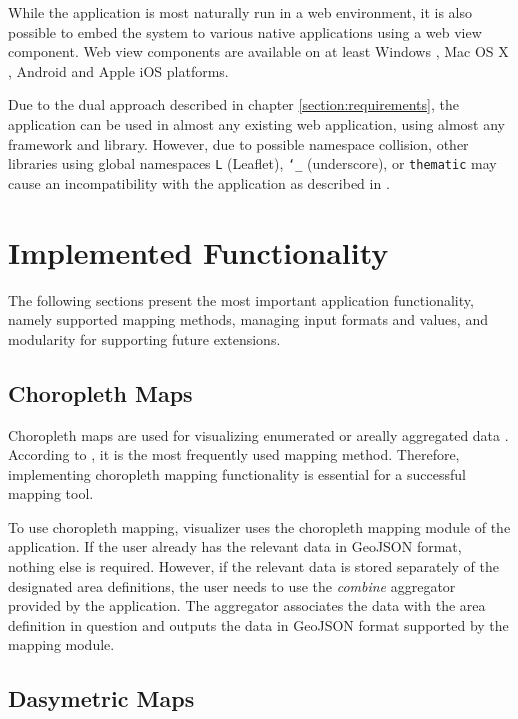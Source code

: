 While the application is most naturally run in a web environment, it is also possible to embed the system to various native applications using a web view component. Web view components are available on at least Windows \citep{small_ten_2012}, Mac OS X \citep{hunter_why_2014}, Android \citep{google_building_2014} and Apple iOS \citep{apple_uiwebview_2014} platforms.

Due to the dual approach described in chapter \ref{section:requirements}, the application can be used in almost any existing web application, using almost any framework and library. However, due to possible namespace collision, other libraries using global namespaces \texttt{L} (Leaflet), \texttt{\char`_} (underscore), or \texttt{thematic} may cause an incompatibility with the application as described in \citet{osmani_essential_2011}.

\section{Implemented Functionality}

The following sections present the most important application functionality, namely supported mapping methods, managing input formats and values, and modularity for supporting future extensions.

\subsection{Choropleth Maps}

Choropleth maps are used for visualizing enumerated or areally aggregated data \citep[chap.~6]{dent_cartography:_2008}. According to \citet[chap.~14]{slocum_thematic_2014}, it is the most frequently used mapping method. Therefore, implementing choropleth mapping functionality is essential for a successful mapping tool.

To use choropleth mapping, visualizer uses the choropleth mapping module of the application. If the user already has the relevant data in GeoJSON format, nothing else is required. However, if the relevant data is stored separately of the designated area definitions, the user needs to use the \emph{combine} aggregator provided by the application. The aggregator associates the data with the area definition in question and outputs the data in GeoJSON format supported by the mapping module.


\subsection{Dasymetric Maps}

